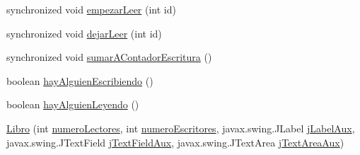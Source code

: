 \begin{DoxyCompactItemize}
\item 
synchronized void \mbox{\hyperlink{classpecl2ignacioribera_1_1_libro_a62a722c8f7e5675f5ab3561a86eda1c1}{empezar\+Leer}} (int id)
\item 
synchronized void \mbox{\hyperlink{classpecl2ignacioribera_1_1_libro_abd96718ab4e489e84f69dc24a7229f18}{dejar\+Leer}} (int id)
\item 
synchronized void \mbox{\hyperlink{classpecl2ignacioribera_1_1_libro_a2e74a67a271d83b8ce93e1807216c997}{sumar\+A\+Contador\+Escritura}} ()
\item 
boolean \mbox{\hyperlink{classpecl2ignacioribera_1_1_libro_ab8a6fd43e4d95068bbb7cfbcf5ff04a5}{hay\+Alguien\+Escribiendo}} ()
\item 
boolean \mbox{\hyperlink{classpecl2ignacioribera_1_1_libro_a3ec78c4737fd60d84388e87f7f1d606f}{hay\+Alguien\+Leyendo}} ()
\item 
\mbox{\hyperlink{classpecl2ignacioribera_1_1_libro_a959d8e97c56f6a3f9f779f26674f12a2}{Libro}} (int \mbox{\hyperlink{classpecl2ignacioribera_1_1_libro_a8c1b217886e7be49de89d57c5ef47c7e}{numero\+Lectores}}, int \mbox{\hyperlink{classpecl2ignacioribera_1_1_libro_a1645482c1d2dbef4a6537b1a96986529}{numero\+Escritores}}, javax.\+swing.\+J\+Label \mbox{\hyperlink{classpecl2ignacioribera_1_1_libro_a4dfd577c8a08d50696cc33d536d5f2fa}{j\+Label\+Aux}}, javax.\+swing.\+J\+Text\+Field \mbox{\hyperlink{classpecl2ignacioribera_1_1_libro_a087e60795a9f9b8c9f393bfcb9a4d70b}{j\+Text\+Field\+Aux}}, javax.\+swing.\+J\+Text\+Area \mbox{\hyperlink{classpecl2ignacioribera_1_1_libro_aa3e89b7cad094609fe96bb5ec370c5a6}{j\+Text\+Area\+Aux}})
\end{DoxyCompactItemize}
